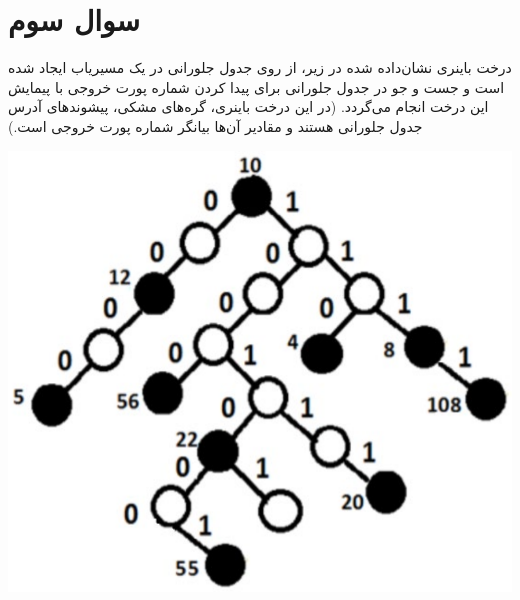 \section{سوال سوم}


درخت باینری نشان‌داده شده در زیر، از روی جدول جلورانی در یک مسیریاب ایجاد شده است و جست و جو در جدول جلورانی برای پیدا کردن شماره پورت خروجی با پیمایش این درخت انجام می‌گردد. (در این درخت باینری، گره‌های مشکی، پیشوندهای آدرس جدول جلورانی هستند و مقادیر آن‌ها بیانگر شماره پورت خروجی است.)


\begin{center}
	\includegraphics*[width=0.5\linewidth]{pics/img1.png}
\end{center}



